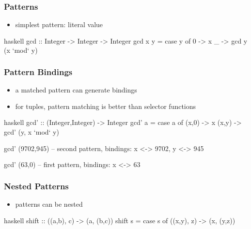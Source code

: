 \documentclass[dvipsnames]{beamer}
\theoremstyle{plain}
\begin{document}
\begin{frame}[fragile]
  \frametitle{Patterns}

  \begin{itemize}
    \item simplest pattern: literal value
  \end{itemize}

  \begin{exampleblock}{}
    \begin{pygments}{haskell}
gcd :: Integer -> Integer -> Integer
gcd x y =
    case y of
      0 -> x
      _ -> gcd y (x `mod` y)
    \end{pygments}
  \end{exampleblock}
\end{frame}

\begin{frame}[fragile]
  \frametitle{Pattern Bindings}

  \begin{itemize}
    \item a matched pattern can generate bindings
    \item for tuples, pattern matching is better than selector functions
  \end{itemize}

  \begin{exampleblock}{}
    \begin{pygments}{haskell}
gcd' :: (Integer,Integer) -> Integer
gcd' a =
    case a of
      (x,0) -> x
      (x,y) -> gcd' (y, x `mod` y)

gcd' (9702,945)
-- second pattern, bindings: x <-> 9702, y <-> 945

gcd' (63,0)
-- first pattern, bindings: x <-> 63
    \end{pygments}
  \end{exampleblock}
\end{frame}

\begin{frame}[fragile]
  \frametitle{Nested Patterns}

  \begin{itemize}
    \item patterns can be nested
  \end{itemize}

  \begin{exampleblock}{}
    \begin{pygments}{haskell}
shift :: ((a,b), c) -> (a, (b,c))
shift s =
    case s of
      ((x,y), z) -> (x, (y,z))
    \end{pygments}
  \end{exampleblock}
\end{frame}
\end{document}
